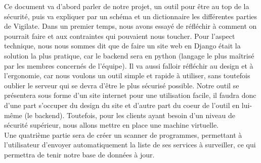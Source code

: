 Ce document va d'abord parler de notre projet, un outil pour être au top de la sécurité, puis va expliquer par un schéma et un dictionnaire les différentes parties de Vigilate. Dans un premier temps, nous avons essayé de réfléchir à comment on pourrait faire et aux contraintes qui pouvaient nous toucher. Pour l'aspect technique, nous nous sommes dit que de faire un site web en Django était la solution la plus pratique, car le backend sera en python (langage le plus maîtrisé par les membres concernés de l'équipe). Il va aussi falloir réfléchir au design et à l'ergonomie, car nous voulons un outil simple et rapide à utiliser, sans toutefois oublier le serveur qui se devra d'être le plus sécurisé possible. Notre outil se présentera sous forme d'un site internet pour une utilisation facile, il faudra donc d'une part s'occuper du design du site et d'autre part du coeur de l'outil en lui-même (le backend). Toutefois, pour les clients ayant besoin d'un niveau de sécurité supérieur, nous allons mettre en place une machine virtuelle.\\
Une quatrième partie sera de créer un scanner de programmes, permettant à l'utilisateur d'envoyer automatiquement la liste de ses services à surveiller, ce qui permettra de tenir notre base de données à jour.\\